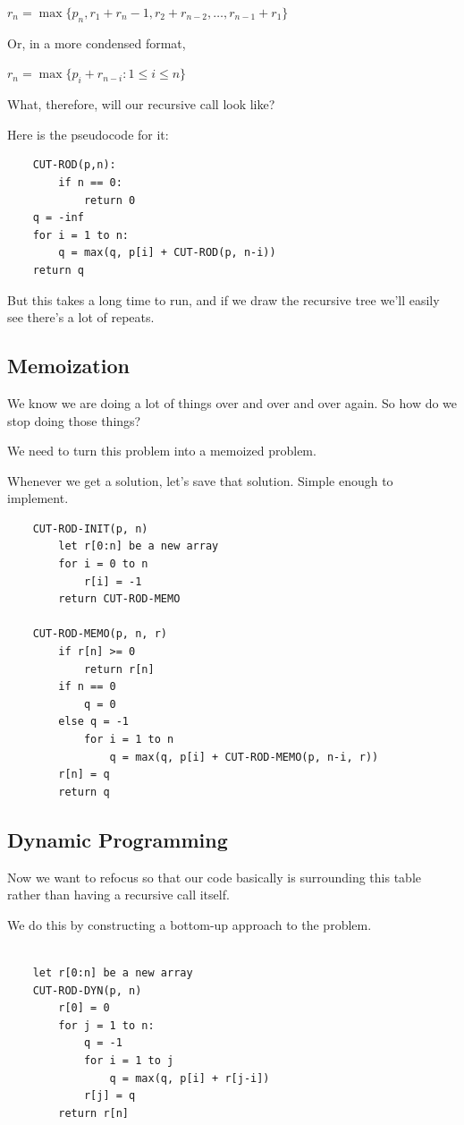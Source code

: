 \documentclass[]{article}
\begin{document}
$r_n = \max\{p_n, r_1 + r_n-1, r_2 + r_{n-2}, \ldots, r_{n-1} + r_1\}$

Or, in a more condensed format,

$r_n = \max\{p_i + r_{n-i} : 1 \leq i \leq n\}$

What, therefore, will our recursive call look like?

Here is the pseudocode for it:

\begin{verbatim}
    CUT-ROD(p,n):
        if n == 0:
            return 0
    q = -inf
    for i = 1 to n:
        q = max(q, p[i] + CUT-ROD(p, n-i))
    return q
\end{verbatim}

But this takes a long time to run, and if we draw the recursive tree we'll easily see there's a lot of repeats.

\subsection*{Memoization}

We know we are doing a lot of things over and over and over again. So how do we stop doing those things? 

We need to turn this problem into a memoized problem.

Whenever we get a solution, let's save that solution. Simple enough to implement. 

\begin{verbatim}
    CUT-ROD-INIT(p, n)
        let r[0:n] be a new array
        for i = 0 to n
            r[i] = -1
        return CUT-ROD-MEMO

    CUT-ROD-MEMO(p, n, r)
        if r[n] >= 0
            return r[n]
        if n == 0
            q = 0
        else q = -1
            for i = 1 to n
                q = max(q, p[i] + CUT-ROD-MEMO(p, n-i, r))
        r[n] = q
        return q
\end{verbatim}

\subsection*{Dynamic Programming}

Now we want to refocus so that our code basically is surrounding this table rather than having a recursive call itself. 

We do this by constructing a bottom-up approach to the problem.

\begin{verbatim}
     
    let r[0:n] be a new array
    CUT-ROD-DYN(p, n)
        r[0] = 0
        for j = 1 to n:
            q = -1
            for i = 1 to j
                q = max(q, p[i] + r[j-i])
            r[j] = q
        return r[n]

\end{verbatim}
\end{document}

